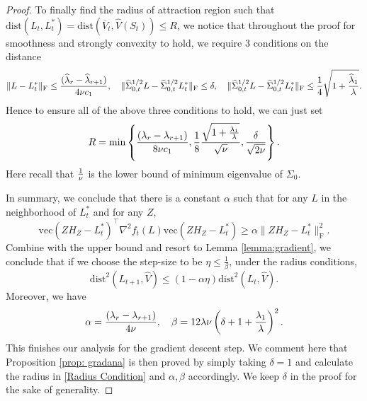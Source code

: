 \documentclass[11pt]{article}
\newcommand{\nb}[1]{\textcolor{orange}{\texttt{[#1]}}}
\newcommand{\rev}[1]{\textcolor{black}{#1}}
\newcommand{\hU}{\widehat{V}}
\newcommand{\gd}{\overline{V}}
\newcommand{\dist}{\mathrm{dist}}
\newcommand{\sot}{\widehat{\Sigma}_{0,t}}
\newcommand{\0}{{\mathbf{0}}}
\newcommand{\ve}{{\mathrm{vec}}}
\begin{document}
\begin{proof}
To finally find the radius of attraction region such that $\dist(L_t,L_t^*)=\dist(\gd_t, \hU(S_t))\leq R$, we notice that throughout the proof for smoothness and strongly convexity to hold, we require 3 conditions on the distance\begin{equation*}
\|L-L_t^*\|_\mathrm{F}\leq \frac{(\widehat{\lambda}_r -\widehat{\lambda}_{r+1})}{4\rev{\nu}c_1},\quad \|\sot^{1/2} L-\sot^{1/2}L_t^*\|_\mathrm{F}\leq \delta, \quad\|\sot^{1/2} L-\sot^{1/2}L_t^*\|_\mathrm{F}\leq\frac{1}{4}\sqrt{1+\frac{\widehat{\lambda}_1}{\lambda}}.
\end{equation*}
Hence to ensure all of the above three conditions to hold, we can just set\begin{equation}\label{Radius Condition}
R=\min\left\{ \frac{(\lambda_r -\lambda_{r+1})}{8\rev{\nu}c_1},\frac{1}{8}\frac{\sqrt{1+\frac{\lambda_1}{\lambda}}}{\sqrt{\rev{\nu}}},\frac{\delta}{\sqrt{2\rev{\nu}}}\right\}.
\end{equation}
Here recall that $\frac{1}{\rev{\nu}}$ is the lower bound of minimum eigenvalue of $\Sigma_0$.
\par In summary, we conclude that there is a constant $\alpha$ such that for any $L$ in the neighborhood of $L_t^*$ and for any $Z$, \begin{equation*}
    \ve (ZH_Z-L^*_t)^\top  \nabla^2f_t(L)\ve (ZH_Z-L^*_t)\geq \alpha \|ZH_Z-L^*_t\|_\mathrm{F}^2.
\end{equation*}
Combine with the upper bound and resort to Lemma \ref{lemma:gradient}, we conclude that if we choose the step-size to be $\eta\leq\frac{1}{\beta}$, under the radius conditions,\begin{equation*}
\mathrm{dist}^2(L_{t+1}, \hU)\leq\left(1-\alpha\eta\right)\mathrm{dist}^2(L_t,\hU).
\end{equation*}
Moreover, we have\begin{equation*}
    \alpha=\frac{(\lambda_r-\lambda_{r+1})}{4\rev{\nu}},\quad \beta=12\lambda\rev{\nu}\left(\delta+1+\frac{\lambda_1}{\lambda}\right)^2.
\end{equation*}
This finishes our analysis for the gradient descent step. We comment here that Proposition \ref{prop: gradana} is then proved by simply taking $\delta=1$ and calculate the radius in \eqref{Radius Condition} and $\alpha,\beta$ accordingly. We keep $\delta$ in the proof for the sake of generality.  

\end{proof}
\end{document}
